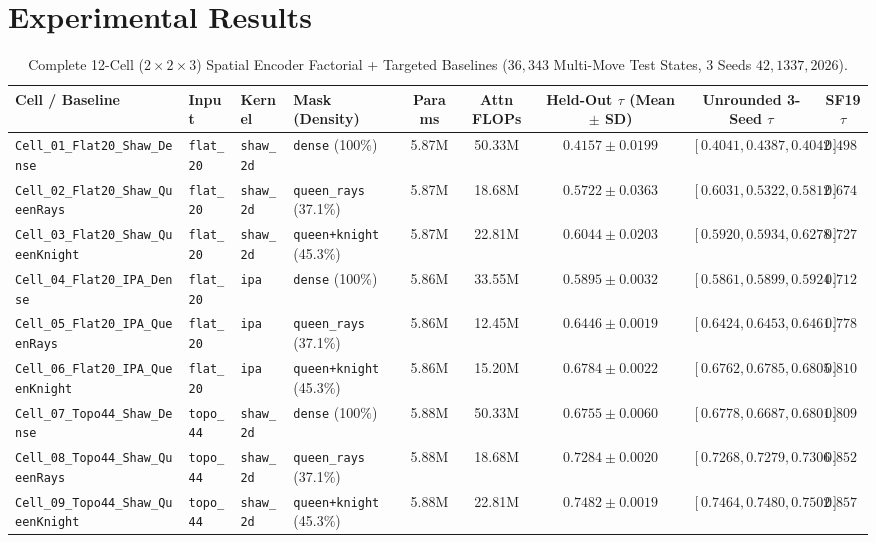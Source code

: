 \documentclass[10pt]{article}
\begin{document}
\section{Experimental Results}

\begin{table}[h!]
\centering
\scriptsize
\caption{Complete 12-Cell ($2 \times 2 \times 3$) Spatial Encoder Factorial + Targeted Baselines ($36{,}343$ Multi-Move Test States, 3 Seeds $42, 1337, 2026$).}
\begin{tabular}{llllccccc}
\toprule
Cell / Baseline & Input & Kernel & Mask (Density) & Params & Attn FLOPs & Held-Out $\tau$ (Mean $\pm$ SD) & Unrounded 3-Seed $\tau$ & SF19 $\tau$ \\
\midrule
\texttt{Cell\_01\_Flat20\_Shaw\_Dense} & \texttt{flat\_20} & \texttt{shaw\_2d} & \texttt{dense} (100\%) & 5.87M & 50.33M & $0.4157 \pm 0.0199$ & $[0.4041, 0.4387, 0.4042]$ & $0.4981$ \\
\texttt{Cell\_02\_Flat20\_Shaw\_QueenRays} & \texttt{flat\_20} & \texttt{shaw\_2d} & \texttt{queen\_rays} (37.1\%) & 5.87M & 18.68M & $0.5722 \pm 0.0363$ & $[0.6031, 0.5322, 0.5812]$ & $0.6743$ \\
\texttt{Cell\_03\_Flat20\_Shaw\_QueenKnight} & \texttt{flat\_20} & \texttt{shaw\_2d} & \texttt{queen+knight} (45.3\%) & 5.87M & 22.81M & $0.6044 \pm 0.0203$ & $[0.5920, 0.5934, 0.6278]$ & $0.7273$ \\
\texttt{Cell\_04\_Flat20\_IPA\_Dense} & \texttt{flat\_20} & \texttt{ipa} & \texttt{dense} (100\%) & 5.86M & 33.55M & $0.5895 \pm 0.0032$ & $[0.5861, 0.5899, 0.5924]$ & $0.7125$ \\
\texttt{Cell\_05\_Flat20\_IPA\_QueenRays} & \texttt{flat\_20} & \texttt{ipa} & \texttt{queen\_rays} (37.1\%) & 5.86M & 12.45M & $0.6446 \pm 0.0019$ & $[0.6424, 0.6453, 0.6461]$ & $0.7780$ \\
\texttt{Cell\_06\_Flat20\_IPA\_QueenKnight} & \texttt{flat\_20} & \texttt{ipa} & \texttt{queen+knight} (45.3\%) & 5.86M & 15.20M & $0.6784 \pm 0.0022$ & $[0.6762, 0.6785, 0.6805]$ & $0.8105$ \\
\texttt{Cell\_07\_Topo44\_Shaw\_Dense} & \texttt{topo\_44} & \texttt{shaw\_2d} & \texttt{dense} (100\%) & 5.88M & 50.33M & $0.6755 \pm 0.0060$ & $[0.6778, 0.6687, 0.6801]$ & $0.8096$ \\
\texttt{Cell\_08\_Topo44\_Shaw\_QueenRays} & \texttt{topo\_44} & \texttt{shaw\_2d} & \texttt{queen\_rays} (37.1\%) & 5.88M & 18.68M & $0.7284 \pm 0.0020$ & $[0.7268, 0.7279, 0.7306]$ & $0.8527$ \\
\texttt{Cell\_09\_Topo44\_Shaw\_QueenKnight} & \texttt{topo\_44} & \texttt{shaw\_2d} & \texttt{queen+knight} (45.3\%) & 5.88M & 22.81M & $0.7482 \pm 0.0019$ & $[0.7464, 0.7480, 0.7502]$ & $\mathbf{0.8576}$ \\

\end{tabular}
\end{table}
\end{document}
